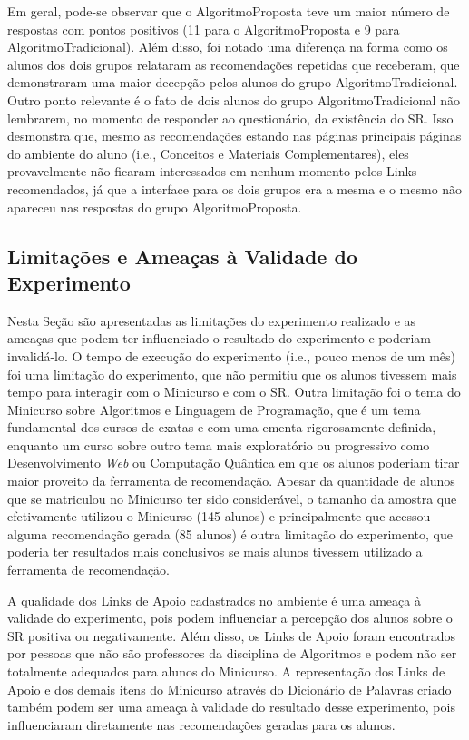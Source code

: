 Em geral, pode-se observar que o AlgoritmoProposta teve um maior número de respostas com pontos positivos (11 para
o AlgoritmoProposta e 9 para AlgoritmoTradicional). Além disso, foi notado uma diferença na forma como os alunos dos
dois grupos relataram as  recomendações repetidas que receberam, que demonstraram uma maior decepção pelos alunos
do grupo AlgoritmoTradicional. Outro ponto relevante é o fato de dois alunos do grupo AlgoritmoTradicional não lembrarem,
no momento de responder ao questionário, da existência do SR. Isso desmonstra que, mesmo as recomendações estando nas
páginas principais páginas do ambiente do aluno (i.e., Conceitos e Materiais Complementares), eles provavelmente não
ficaram interessados em nenhum momento pelos Links recomendados, já que a interface para os dois grupos era a mesma e o
mesmo não apareceu nas respostas do grupo AlgoritmoProposta.

\subsection{Limitações e Ameaças à Validade do Experimento}\label{subsection:ameacas-a-validade}

Nesta Seção são apresentadas as limitações do experimento realizado e as ameaças que podem ter influenciado o resultado
do experimento e poderiam invalidá-lo. O tempo de execução do experimento (i.e., pouco menos de um mês) foi uma limitação do experimento, que não permitiu que
os alunos tivessem mais tempo para interagir com o Minicurso e com o SR. Outra limitação foi o tema do Minicurso sobre
Algoritmos e Linguagem de Programação, que é um tema fundamental dos cursos de exatas e com uma ementa rigorosamente
definida, enquanto um curso sobre outro tema mais exploratório ou progressivo como Desenvolvimento \textit{Web} ou
Computação Quântica em que os alunos poderiam tirar maior proveito da ferramenta de recomendação. Apesar da quantidade
de alunos que se matriculou no Minicurso ter sido considerável, o tamanho da amostra que efetivamente utilizou o Minicurso
(145 alunos) e principalmente que acessou alguma recomendação gerada (85 alunos) é outra limitação do
experimento, que poderia ter resultados mais conclusivos se mais alunos tivessem utilizado a ferramenta de recomendação.

A qualidade dos Links de Apoio cadastrados no ambiente \adaptwebspace é uma ameaça à validade do experimento, pois podem
influenciar a percepção dos alunos sobre o SR positiva ou negativamente. Além disso, os Links de Apoio foram encontrados
por pessoas que não são professores da disciplina de Algoritmos e podem não ser totalmente adequados para alunos do Minicurso.
A representação dos Links de Apoio e dos demais itens do Minicurso através do Dicionário de Palavras criado também
podem ser uma ameaça à validade do resultado desse experimento, pois influenciaram diretamente nas recomendações geradas
para os alunos.

